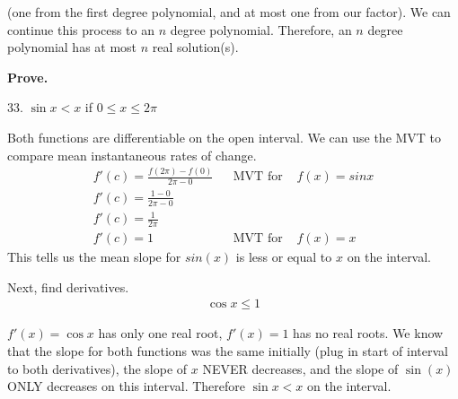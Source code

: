 \documentclass{article}
\begin{document}
\begin{description}
\begin{description}
                        (one from the first degree polynomial, and at most one from our factor). We can continue this process to an $n$ degree polynomial.
                        Therefore, an $n$ degree polynomial has at most $n$ real solution(s).
            \end{description}
      \item\textbf{Prove.}
            \begin{description}
                  \item 33. $\sin{x} < x$ if $0 \leq x \leq 2\pi$

                        Both functions are differentiable on the open interval. We can use the MVT to compare mean instantaneous rates
                        of change.
                        \begin{align*}
                              f'(c) = \frac{f(2\pi) - f(0)}{2\pi - 0} &  & \text{MVT for } & f(x) = sin{x} \\
                              f'(c) = \frac{1 - 0}{2\pi - 0}                                               \\
                              f'(c) = \frac{1}{2\pi}                                                       \\[2em]
                              f'(c) = 1                               &  & \text{MVT for } & f(x) = x
                        \end{align*}
                        This tells us the mean slope for $sin(x)$ is less or equal to $x$ on the interval.

                        Next, find derivatives.
                        \begin{align*}
                              \cos{x} \leq 1
                        \end{align*}

                        $f'(x) = \cos{x}$ has only one real root, $f'(x) = 1$ has no real roots. We know that the slope
                        for both functions was the same initially (plug in start of interval to both derivatives), the slope of $x$ NEVER decreases, and the slope of
                        $\sin(x)$ ONLY decreases on this interval. Therefore $\sin{x} < x$ on the interval.
            \end{description}
\end{description}
\end{document}
